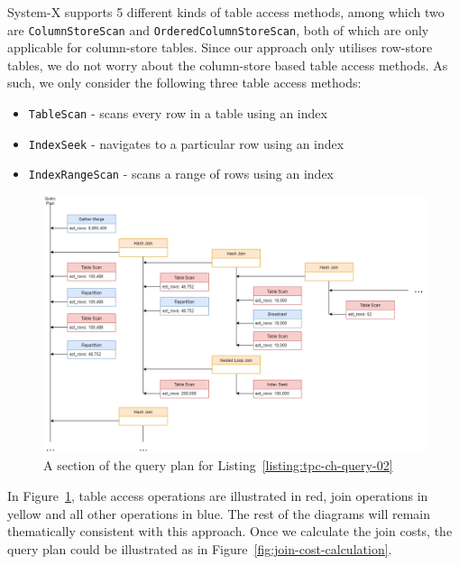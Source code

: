System-X supports 5 different kinds of table access methods, among which two are \texttt{ColumnStoreScan} and \texttt{OrderedColumnStoreScan}, both of which are only applicable for column-store tables. Since our approach only utilises row-store tables, we do not worry about the column-store based table access methods. As such, we only consider the following three table access methods:

\begin{itemize}
    \item \texttt{TableScan} - scans every row in a table using an index
    \item \texttt{IndexSeek} - navigates to a particular row using an index
    \item \texttt{IndexRangeScan} - scans a range of rows using an index
\end{itemize}

\begin{figure}[h]
  \centering
  \includegraphics[width=\linewidth]{figures/query_02_plan_01.png}
  \caption{A section of the query plan for Listing~\ref{listing:tpc-ch-query-02}}
  \label{fig:tpc-ch-query-02-plan}
\end{figure}

In Figure~\ref{fig:tpc-ch-query-02-plan}, table access operations are illustrated in red, join operations in yellow and all other operations in blue. The rest of the diagrams will remain thematically consistent with this approach. Once we calculate the join costs, the query plan could be illustrated as in Figure~\ref{fig:join-cost-calculation}.

